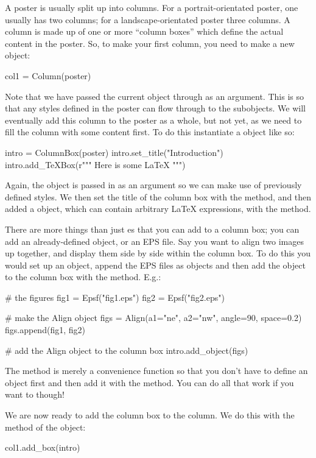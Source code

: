 A poster is usually split up into columns.  For a portrait-orientated
poster, one usually has two columns; for a landscape-orientated poster three
columns.  A column is made up of one or more ``column boxes'' which define
the actual content in the poster.  So, to make your first column, you need
to make a new  object:
\begin{python}
col1 = Column(poster)
\end{python}
Note that we have passed the current  object through as an
argument.  This is so that any styles defined in the poster can flow through
to the subobjects.  We will eventually add this column to the poster as a
whole, but not yet, as we need to fill the column with some content first.
To do this instantiate a  object like so:
\begin{python}
intro = ColumnBox(poster)
intro.set_title("Introduction")
intro.add_TeXBox(r"""
Here is some \LaTeX{}
""")
\end{python}
Again, the  object is passed in as an argument so we can make
use of previously defined styles.  We then set the title of the column box
with the  method, and then added a  object,
which can contain arbitrary \LaTeX{} expressions, with the
 method.

There are more things than just es that you can add to a column
box; you can add an already-defined \pyscript object, or an EPS file.  Say
you want to align two images up together, and display them side by side
within the column box.  To do this you would set up an  object,
append the EPS files as  objects and then add the 
object to the column box with the  method.  E.g.:
\begin{python}
# the figures
fig1 = Epsf("fig1.eps")
fig2 = Epsf("fig2.eps")

# make the Align object
figs = Align(a1="ne", a2="nw", angle=90, space=0.2)
figs.append(fig1, fig2)

# add the Align object to the column box
intro.add_object(figs)
\end{python}

The  method is merely a convenience function so that you
don't have to define an  object first and then add it with the
 method.  You can do all that work if you want to though!

We are now ready to add the column box to the column.  We do this with the
 method of the  object:
\begin{python}
col1.add_box(intro)
\end{python}

